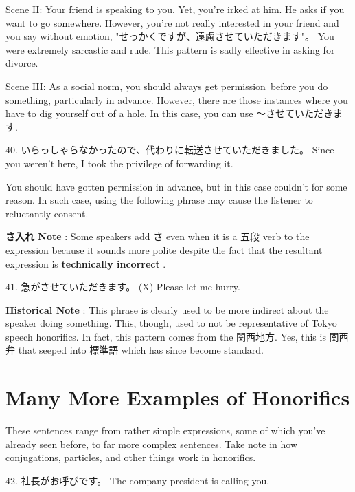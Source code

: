 \par{Scene II: Your friend is speaking to you. Yet, you're irked at him. He asks if you want to go somewhere. However, you're not really interested in your friend and you say without emotion, "せっかくですが、遠慮させていただきます"。 You were extremely sarcastic and rude. This pattern is sadly effective in asking for divorce. }

\par{Scene III: As a social norm, you should always get permission before you do something, particularly in advance. However, there are those instances where you have to dig yourself out of a hole. In this case, you can use ～させていただきます. }

\par{40. いらっしゃらなかったので、代わりに転送させていただきました。 \hfill\break
Since you weren't here, I took the privilege of forwarding it. }

\par{You should have gotten permission in advance, but in this case couldn't for some reason. In such case, using the following phrase may cause the listener to reluctantly consent. }

\par{\textbf{さ入れ Note }: Some speakers add さ even when it is a 五段 verb to the expression because it sounds more polite despite the fact that the resultant expression is \textbf{technically incorrect }. }

\par{41. 急がさせていただきます。 (X) \hfill\break
Please let me hurry. }

\par{\textbf{Historical Note }: This phrase is clearly used to be more indirect about the speaker doing something. This, though, used to not be representative of Tokyo speech honorifics. In fact, this pattern comes from the 関西地方. Yes, this is 関西弁 that seeped into 標準語 which has since become standard. }
      
\section{Many More Examples of Honorifics}
   These sentences range from rather simple expressions, some of which you've already seen before, to far more complex sentences. Take note in how conjugations, particles, and other things work in honorifics.  
\par{42. 社長がお呼びです。 \hfill\break
The company president is calling you. }

